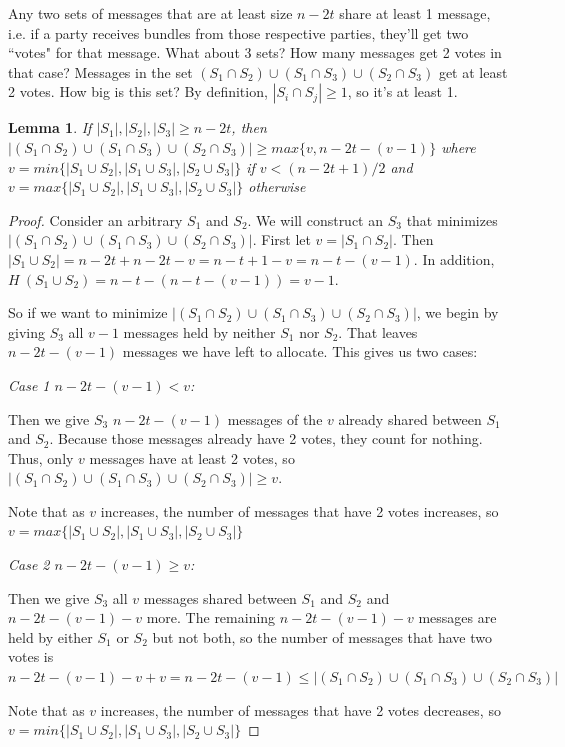 \documentclass{article}
\newtheorem{lemma}{Lemma}
\begin{document}
Any two sets of messages that are at least size $n - 2t$ share at least 1 message, i.e. if a party receives bundles from those respective parties, they'll get two ``votes" for that message. What about 3 sets? How many messages get 2 votes in that case? Messages in the set $(S_1 \cap S_2) \cup (S_1 \cap S_3) \cup (S_2 \cap S_3)$ get at least 2 votes. How big is this set? By definition, $|S_i \cap S_j| \geq 1$, so it's at least 1. 

\begin{lemma}
If $|S_1|, |S_2|, |S_3| \geq n - 2t$, then $|(S_1 \cap S_2) \cup (S_1 \cap S_3) \cup (S_2 \cap S_3)| \geq max\{v, n - 2t - (v - 1)\}$ where $v = min\{|S_1 \cup S_2|, |S_1 \cup S_3|, |S_2 \cup S_3|\}$ if $v < (n - 2t + 1) / 2$ and  $v = max\{|S_1 \cup S_2|, |S_1 \cup S_3|, |S_2 \cup S_3|\}$ otherwise
\end{lemma}

\begin{proof}
Consider an arbitrary $S_1$ and $S_2$. We will construct an $S_3$ that minimizes $|(S_1 \cap S_2) \cup (S_1 \cap S_3) \cup (S_2 \cap S_3)|$. First let $v = |S_1 \cap S_2|$. Then $|S_1 \cup S_2| = n - 2t + n - 2t - v = n - t + 1 - v = n - t - (v - 1)$. In addition, $H \ (S_1 \cup S_2) = n - t - (n - t - (v - 1)) = v - 1$.

So if we want to minimize $|(S_1 \cap S_2) \cup (S_1 \cap S_3) \cup (S_2 \cap S_3)|$, we begin by giving $S_3$ all $v - 1$ messages held by neither $S_1$ nor $S_2$. That leaves $n - 2t - (v - 1)$ messages we have left to allocate. This gives us two cases:

\emph{Case 1 $n - 2t - (v-1) < v$:}

Then we give $S_3$ $n - 2t - (v-1)$ messages of the $v$ already shared between $S_1$ and $S_2$. Because those messages already have 2 votes, they count for nothing. Thus, only $v$ messages have at least 2 votes, so $|(S_1 \cap S_2) \cup (S_1 \cap S_3) \cup (S_2 \cap S_3)| \geq v$.

Note that as $v$ increases, the number of messages that have 2 votes increases, so $v = max\{|S_1 \cup S_2|, |S_1 \cup S_3|, |S_2 \cup S_3|\}$

\emph{Case 2 $n - 2t - (v-1) \geq v$:}

Then we give $S_3$ all $v$ messages shared between $S_1$ and $S_2$ and $n - 2t - (v-1) - v$ more. The remaining $n - 2t - (v-1) - v$ messages are held by either $S_1$ or $S_2$ but not both, so the number of messages that have two votes is $n - 2t - (v - 1) - v + v = n - 2t - (v-1) \leq |(S_1 \cap S_2) \cup (S_1 \cap S_3) \cup (S_2 \cap S_3)|$

Note that as $v$ increases, the number of messages that have 2 votes decreases, so $v = min\{|S_1 \cup S_2|, |S_1 \cup S_3|, |S_2 \cup S_3|\}$

\end{proof}
\end{document}
